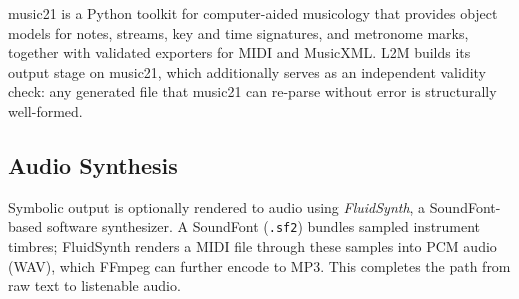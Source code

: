 music21 \cite{cuthbert10music21} is a Python toolkit for computer-aided
musicology that provides object models for notes, streams, key and time
signatures, and metronome marks, together with validated exporters for MIDI
and MusicXML. L2M builds its output stage on music21, which additionally
serves as an independent validity check: any generated file that music21
can re-parse without error is structurally well-formed.

\subsection{Audio Synthesis}

Symbolic output is optionally rendered to audio using
\emph{FluidSynth}, a SoundFont-based software synthesizer. A SoundFont
(\texttt{.sf2}) bundles sampled instrument timbres; FluidSynth renders a
MIDI file through these samples into PCM audio (WAV), which FFmpeg can
further encode to MP3. This completes the path from raw text to listenable
audio.
